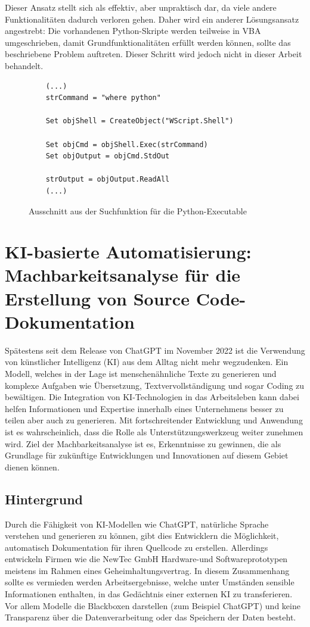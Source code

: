 \documentclass[11pt,a4paper]{report}
\begin{document}
\noindent
Dieser Ansatz stellt sich als effektiv, aber unpraktisch dar, da viele andere Funktionalitäten dadurch verloren gehen. Daher wird ein anderer Lösungsansatz angestrebt: Die vorhandenen Python-Skripte werden teilweise in VBA umgeschrieben, damit Grundfunktionalitäten erfüllt werden können, sollte das beschriebene Problem auftreten. Dieser Schritt wird jedoch nicht in dieser Arbeit behandelt.

\begin{figure}[H]
    \centering
    \begin{verbatim}
    (...)
    strCommand = "where python"
    
    Set objShell = CreateObject("WScript.Shell")
    
    Set objCmd = objShell.Exec(strCommand)
    Set objOutput = objCmd.StdOut
    
    strOutput = objOutput.ReadAll
    (...)
    \end{verbatim}
    \caption{Ausschnitt aus der Suchfunktion für die Python-Executable}
    \label{code:VBA_Search()}
\end{figure}



\chapter{
KI-basierte Automatisierung: Machbarkeitsanalyse für die Erstellung
von Source Code-Dokumentation
} \label{chap:ki}
Spätestens seit dem Release von ChatGPT im November 2022 ist die Verwendung von künstlicher Intelligenz (KI) aus dem Alltag nicht mehr wegzudenken. Ein Modell, welches in der Lage ist menschenähnliche Texte zu generieren und komplexe Aufgaben wie Übersetzung, Textvervollständigung und sogar Coding zu bewältigen. Die Integration von KI-Technologien in das Arbeitsleben kann dabei helfen Informationen und Expertise innerhalb eines Unternehmens besser zu teilen aber auch zu generieren. Mit fortschreitender Entwicklung und Anwendung ist es wahrscheinlich, dass die Rolle als Unterstützungswerkzeug weiter zunehmen wird. Ziel der Machbarkeitsanalyse ist es, Erkenntnisse zu gewinnen, die als Grundlage für zukünftige Entwicklungen und Innovationen auf diesem Gebiet dienen können.

\section{Hintergrund}

Durch die Fähigkeit von KI-Modellen wie ChatGPT, natürliche Sprache verstehen und generieren zu können, gibt dies Entwicklern die Möglichkeit, automatisch Dokumentation für ihren Quellcode zu erstellen. Allerdings entwickeln Firmen wie die NewTec GmbH Hardware-und Softwareprototypen meistens im Rahmen eines Geheimhaltungsvertrag. In diesem Zusammenhang sollte es vermieden werden Arbeitsergebnisse, welche unter Umständen sensible Informationen enthalten, in das Gedächtnis einer externen KI zu transferieren. Vor allem Modelle die Blackboxen darstellen (zum Beispiel ChatGPT) und keine Transparenz über die Datenverarbeitung oder das Speichern der Daten besteht.
\end{document}
